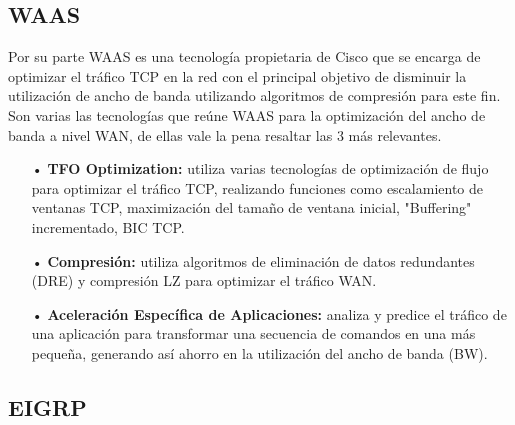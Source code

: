 \subsection{WAAS}
\label{sec:WAAS}

Por su parte WAAS es una tecnología propietaria de Cisco que se encarga de optimizar el tráfico TCP en la red con el principal objetivo de disminuir la utilización de ancho de banda utilizando algoritmos de compresión para este fin. Son varias las tecnologías que reúne WAAS para la optimización del ancho de banda a nivel WAN, de ellas vale la pena resaltar las 3 más relevantes.

\begin{itemize}
\item[•]\textbf{TFO Optimization:} utiliza varias tecnologías de optimización de flujo para optimizar el tráfico TCP, realizando funciones como escalamiento de ventanas TCP, maximización del tamaño de ventana inicial, "Buffering" incrementado, BIC TCP.
\item[•]\textbf{Compresión:} utiliza algoritmos de eliminación de datos redundantes (DRE) y compresión LZ para optimizar el tráfico WAN.
\item[•]\textbf{Aceleración Específica de Aplicaciones:} analiza y predice el tráfico de una aplicación para transformar una secuencia de comandos en una más pequeña, generando así ahorro en la utilización del ancho de banda (BW).
\end{itemize}


\subsection{EIGRP}
\label{sec:EIGRP}


